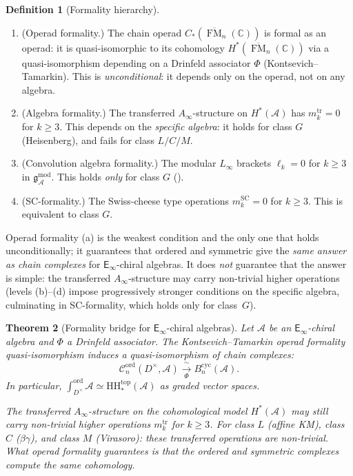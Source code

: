 \documentclass[11pt,reqno]{amsart}
\newtheorem{theorem}{Theorem}[section]
\theoremstyle{definition}
\newtheorem{definition}[theorem]{Definition}
\theoremstyle{remark}
\newcommand{\cA}{\mathcal{A}}
\newcommand{\cC}{\mathcal{C}}
\newcommand{\HH}{\mathrm{HH}}
\newcommand{\Ainf}{A_{\infty}}
\newcommand{\Einf}{\mathsf{E}_{\infty}}
\DeclareMathOperator{\FM}{FM}
\newcommand{\gmod}{\mathfrak{g}^{\mathrm{mod}}_{\cA}}
\newcommand{\CC}{\mathbb{C}}
\numberwithin{equation}{section}
\begin{document}
\begin{definition}[Formality hierarchy]
\label{def:formality-hierarchy}
\begin{enumerate}[label=\textup{(\alph*)}]
\item \textup{(Operad formality.)} The chain operad
  $C_*(\overline{\FM}_n(\CC))$ is formal as an operad:
  it is quasi-isomorphic to its cohomology
  $H^*(\overline{\FM}_n(\CC))$ via a quasi-isomorphism
  depending on a Drinfeld associator $\Phi$
  \textup{(}Kontsevich--Tamarkin\textup{)}.
  This is \emph{unconditional}: it depends only on the
  operad, not on any algebra.
\item \textup{(Algebra formality.)} The transferred
  $\Ainf$-structure on $H^*(\cA)$ has
  $m_k^{\mathrm{tr}} = 0$ for $k \geq 3$.
  This depends on the \emph{specific algebra}:
  it holds for class $G$ \textup{(}Heisenberg\textup{)},
  and fails for class $L/C/M$.
\item \textup{(Convolution algebra formality.)}
  The modular $L_\infty$ brackets $\ell_k = 0$ for
  $k \geq 3$ in $\gmod$.
  This holds \emph{only} for class $G$
  \textup{(}\cite[prop:sc-formal-iff-class-g]{Lorgat26I}\textup{)}.
\item \textup{(SC-formality.)} The Swiss-cheese type
  operations $m_k^{\mathrm{SC}} = 0$ for $k \geq 3$.
  This is equivalent to class $G$.
\end{enumerate}
Operad formality \textup{(a)} is the weakest condition and
the only one that holds unconditionally; it guarantees
that ordered and symmetric give the \emph{same answer as
chain complexes} for $\Einf$-chiral algebras. It does
\emph{not} guarantee that the answer is simple: the
transferred $\Ainf$-structure may carry non-trivial higher
operations \textup{(}levels (b)--(d) impose progressively
stronger conditions on the specific algebra,
culminating in SC-formality, which holds only for
class~$G$\textup{)}.
\end{definition}

\begin{theorem}[Formality bridge for $\Einf$-chiral algebras]
\label{thm:formality-bridge}
Let $\cA$ be an $\Einf$-chiral algebra and $\Phi$ a
Drinfeld associator. The Kontsevich--Tamarkin operad
formality quasi-isomorphism induces a quasi-isomorphism
of chain complexes:
\begin{equation}\label{eq:formality-bridge}
  \cC_n^{\mathrm{ord}}(D^\times, \cA)
  \xrightarrow[\Phi]{\;\sim\;}
  B^{\mathrm{cyc}}_n(\cA).
\end{equation}
In particular,
$\int_{D^\times}^{\mathrm{ord}} \cA
\simeq \HH^{\mathrm{top}}_*(\cA)$
as graded vector spaces.

The transferred $\Ainf$-structure on the cohomological
model $H^*(\cA)$ may still carry non-trivial higher
operations $m_k^{\mathrm{tr}}$ for $k \geq 3$. For
class $L$ \textup{(}affine KM\textup{)}, class $C$
\textup{(}$\beta\gamma$\textup{)}, and class $M$
\textup{(}Virasoro\textup{)}: these transferred
operations are non-trivial. What operad formality
guarantees is that the ordered and symmetric complexes
compute the same cohomology.
\end{theorem}
\end{document}
